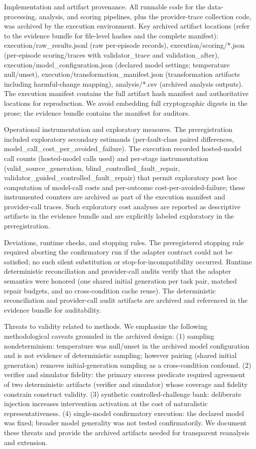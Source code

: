 \documentclass[conference]{IEEEtran}
\begin{document}
Implementation and artifact provenance. All runnable code for the data-processing, analysis, and scoring pipelines, plus the provider-trace collection code, was archived by the execution environment. Key archived artifact locations (refer to the evidence bundle for file-level hashes and the complete manifest): execution/raw\_results.jsonl (raw per-episode records), execution/scoring/*.json (per-episode scoring/traces with validator\_trace and validation\_after), execution/model\_configuration.json (declared model settings; temperature null/unset), execution/transformation\_manifest.json (transformation artifacts including harmful-change mapping), analysis/*.csv (archived analysis outputs). The execution manifest contains the full artifact hash manifest and authoritative locations for reproduction. We avoid embedding full cryptographic digests in the prose; the evidence bundle contains the manifest for auditors.

Operational instrumentation and exploratory measures. The preregistration included exploratory secondary estimands (per-fault-class paired differences, model\_call\_cost\_per\_avoided\_failure). The execution recorded hosted-model call counts (hosted-model calls used) and per-stage instrumentation (valid\_source\_generation, blind\_controlled\_fault\_repair, validator\_guided\_controlled\_fault\_repair) that permit exploratory post hoc computation of model-call costs and per-outcome cost-per-avoided-failure; these instrumented counters are archived as part of the execution manifest and provider-call traces. Such exploratory cost analyses are reported as descriptive artifacts in the evidence bundle and are explicitly labeled exploratory in the preregistration.

Deviations, runtime checks, and stopping rules. The preregistered stopping rule required aborting the confirmatory run if the adapter contract could not be satisfied; no such silent substitution or stop-for-incompatibility occurred. Runtime deterministic reconciliation and provider-call audits verify that the adapter semantics were honored (one shared initial generation per task pair, matched repair budgets, and no cross-condition cache reuse). The deterministic reconciliation and provider-call audit artifacts are archived and referenced in the evidence bundle for auditability.

Threats to validity related to methods. We emphasize the following methodological caveats grounded in the archived design: (1) sampling nondeterminism: temperature was null/unset in the archived model configuration and is not evidence of deterministic sampling; however pairing (shared initial generation) removes initial-generation sampling as a cross-condition confound. (2) verifier and simulator fidelity: the primary success predicate required agreement of two deterministic artifacts (verifier and simulator) whose coverage and fidelity constrain construct validity. (3) synthetic controlled-challenge bank: deliberate injection increases intervention activation at the cost of naturalistic representativeness. (4) single-model confirmatory execution: the declared model was fixed; broader model generality was not tested confirmatorily. We document these threats and provide the archived artifacts needed for transparent reanalysis and extension.
\end{document}
